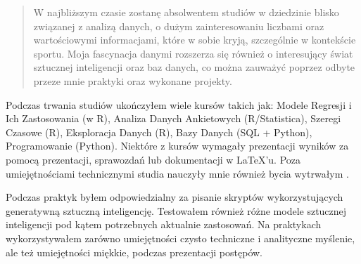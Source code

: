 \documentclass[10pt,a4paper,ragged2e,withhyper]{altacv}
\begin{document}
\begin{paracol}{2}
		
		\newpage
		
		\switchcolumn
		
		\begin{quote}
			W najbliższym czasie zostanę absolwentem studiów w dziedzinie blisko związanej z analizą danych, o dużym zainteresowaniu liczbami oraz wartościowymi informacjami, które w sobie kryją, szczególnie w kontekście sportu. Moja fascynacja danymi rozszerza się również o interesujący świat sztucznej inteligencji oraz baz danych, co można zauważyć poprzez odbyte przeze mnie praktyki oraz wykonane projekty. 
		\end{quote}
		
		Podczas trwania studiów ukończyłem wiele kursów takich jak: Modele Regresji i Ich Zastosowania (w R), Analiza Danych Ankietowych (R/Statistica), Szeregi Czasowe (R), Eksploracja Danych (R), Bazy Danych (SQL + Python), Programowanie (Python). Niektóre z kursów wymagały prezentacji wyników za pomocą prezentacji, sprawozdań lub dokumentacji w \LaTeX'u. Poza umiejętnościami technicznymi studia nauczyły mnie również bycia wytrwałym .
		
		Podczas praktyk byłem odpowiedzialny za pisanie skryptów wykorzystujących generatywną sztuczną inteligencję. Testowałem również różne modele sztucznej inteligencji pod kątem potrzebnych aktualnie zastosowań.  
		Na praktykach wykorzystywałem zarówno umiejętności czysto techniczne i analityczne myślenie, ale też umiejętności miękkie, podczas prezentacji postępów. 


\end{paracol}
\end{document}
